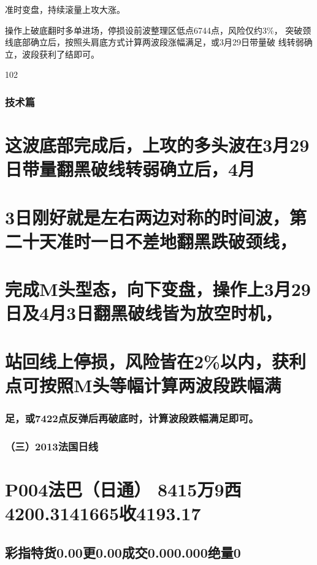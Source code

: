 \documentclass{article}
\begin{document}
准时变盘，持续滚量上攻大涨。

操作上破底翻时多单进场，停损设前波整理区低点6744点，风险仅约3\%， 突破颈线底部确立后，按照头肩底方式计算两波段涨幅满足，或3月29日带量破 线转弱确立，波段获利了结即可。

102

\clearpage

\subsubsection{技术篇}

\section{这波底部完成后，上攻的多头波在3月29日带量翻黑破线转弱确立后，4月}

\section{3日刚好就是左右两边对称的时间波，第二十天准时一日不差地翻黑跌破颈线，}

\section{完成M头型态，向下变盘，操作上3月29日及4月3日翻黑破线皆为放空时机，}

\section{站回线上停损，风险皆在2\%以内，获利点可按照M头等幅计算两波段跌幅满}

\subsubsection{足，或7422点反弹后再破底时，计算波段跌幅满足即可。}

\subsubsection{（三）2013法国日线}

\section{P004法巴（日通） 8415万9西4200.3141665收4193.17}

\subsection{彩指特货0.00更0.00成交0.000.000绝量0}
\end{document}
